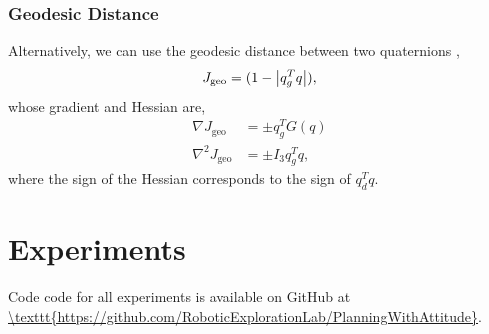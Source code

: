 \documentclass{svproc}
\newcommand{\R}{\mathbb{R}}
\begin{document}
            
            
            
            
            
        \subsubsection{Geodesic Distance}
            Alternatively, we can use the geodesic distance between two quaternions \cite{Kuffner2004},
            \begin{equation} \label{eq:quat_geodesic}
                J_\text{geo} = (1-\abs{q_g^T q}) ,
            \end{equation}
            whose gradient and Hessian are,
            \begin{align}
                \nabla J_\text{geo} &= \pm q_g^T G(q) \\
                \nabla^2 J_\text{geo} &= \pm I_3 q_g^T q ,
            \end{align}
            where the sign of the Hessian corresponds to the sign of $q_d^T q$.
            
            
 

\section{Experiments} \label{sec:experiments}
    Code code for all experiments is available on GitHub at \url{\texttt{https://github.com/RoboticExplorationLab/PlanningWithAttitude}}.
        
\end{document}
